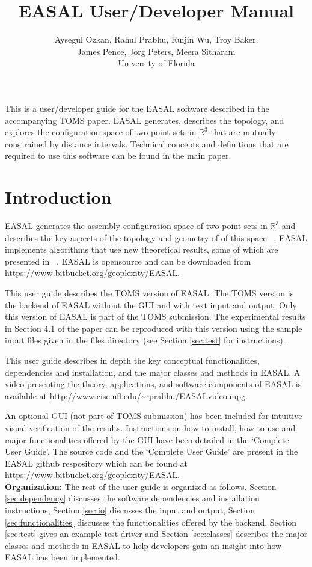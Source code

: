 \documentclass[10pt]{article}
\title{EASAL User/Developer Manual}
\author{Aysegul Ozkan, Rahul Prabhu, Ruijin Wu, Troy Baker, \\James Pence, Jorg
Peters, Meera Sitharam \\ University of Florida}
\begin{document}
\maketitle
This is a user/developer guide for the EASAL software described in the
accompanying TOMS paper.
EASAL generates, describes the topology, and explores the configuration space 
of two point sets in $\mathbb{R}^3$ that are mutually constrained by
distance intervals. Technical concepts and definitions that are required to use
this software can be found in the main paper.


\section{Introduction}
\label{sec:intro}
EASAL generates the assembly configuration space of two point sets in $\mathbb{R}^3$
and describes the key aspects of the topology and geometry of of this space
~\cite{Sitharam:2012:EASAL, Ozkan2014MainEasal, Wu2014Virus}.
EASAL implements
algorithms that use new theoretical results, some of which are presented in
~\cite{Ozkan2014MainEasal, SiGa:2010, Sitharam:2012:EASAL}.  
EASAL is opensource and can be downloaded from
\url{https://www.bitbucket.org/geoplexity/EASAL}.  

This user guide describes the TOMS version of EASAL.
The TOMS version is the backend of EASAL
without the GUI and with text input and output. Only this version of
EASAL is part of the TOMS submission. 
The experimental results in Section 4.1 of the paper can be reproduced
with this version using the sample input files given in the files directory 
(see Section \ref{sec:test} for instructions).


This user guide describes in depth the key conceptual functionalities,
dependencies and installation, and the major classes and methods in EASAL.  
A video presenting the theory, applications, and software components of
EASAL is available at \url{http://www.cise.ufl.edu/~rprabhu/EASALvideo.mpg}.

An optional GUI (not part of TOMS submission) has been included for intuitive
visual verification of the results.  Instructions on how to install, how to use
and major functionalities offered by the GUI have been detailed in the
`Complete User Guide'. The source code and the `Complete User Guide' are
present in the EASAL github respository which can be found at
\url{https://www.bitbucket.org/geoplexity/EASAL}.\\ 


\noindent\textbf{Organization:} 
The rest of the user guide is organized as follows.
Section \ref{sec:dependency} discusses the software dependencies and
installation instructions, Section \ref{sec:io} discusses the input and output,
Section \ref{sec:functionalities} discusses the functionalities offered by the
backend. Section \ref{sec:test} gives an example test driver and Section
\ref{sec:classes} describes the major classes and methods in EASAL to help
developers gain an insight into how EASAL has been implemented.
\end{document}
